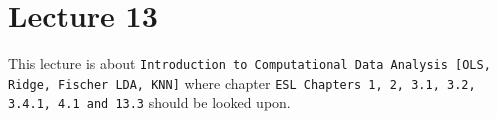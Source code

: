 \chapter{Lecture 13}

This lecture is about \texttt{Introduction to Computational Data Analysis [OLS, Ridge, Fischer LDA, KNN]} where chapter \texttt{ESL Chapters 1, 2, 3.1,
3.2, 3.4.1, 4.1 and 13.3} should be looked upon.

